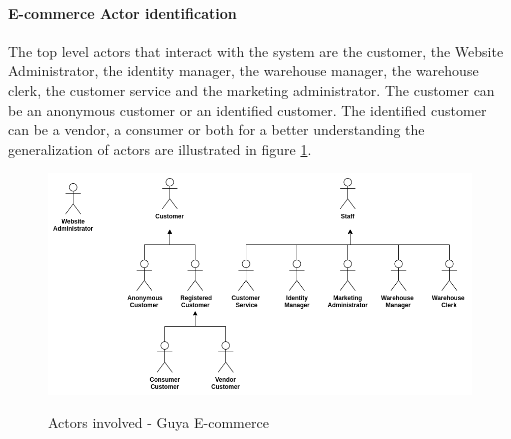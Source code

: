 \paragraph{E-commerce Actor identification}
The top level actors that interact with the system are the customer, the Website Administrator, the identity manager, the warehouse manager, the warehouse clerk, the customer service and the marketing administrator. The customer can be an anonymous customer or an identified customer. The identified customer can be a vendor, a consumer or both for a better understanding the generalization of actors are illustrated in figure \ref{shop_actors}.
\begin{figure}[!h]
\includegraphics[width=13cm, keepaspectratio]{images/shop_actors}
\label{shop_actors}
\caption{Actors involved - Guya E-commerce}
\end{figure}

